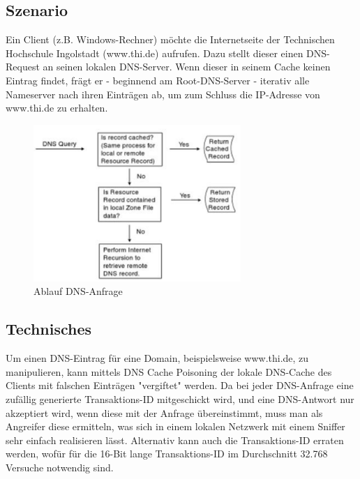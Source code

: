 \subsection*{Szenario}
Ein Client (z.B. Windows-Rechner) möchte die Internetseite der Technischen Hochschule Ingolstadt (www.thi.de) aufrufen. Dazu stellt dieser einen DNS-Request an seinen lokalen DNS-Server.
Wenn dieser in seinem Cache keinen Eintrag findet, frägt er - beginnend am Root-DNS-Server - iterativ alle Nameserver nach ihren Einträgen ab, um zum Schluss die IP-Adresse von www.thi.de
zu erhalten.\\
\begin{figure}[h!]
	\centering
	\includegraphics[width=0.7\textwidth]{bilder/DNS-Request.pdf}
	\caption{Ablauf DNS-Anfrage \cite{young2003hacker}}
	\label{fig:dnsrequest}
\end{figure}

\subsection*{Technisches}
Um einen DNS-Eintrag für eine Domain, beispielsweise www.thi.de, zu manipulieren, kann mittels DNS Cache Poisoning der lokale DNS-Cache des Clients mit falschen Einträgen "vergiftet" werden.
Da bei jeder DNS-Anfrage eine zufällig generierte Transaktions-ID mitgeschickt wird, und eine DNS-Antwort nur akzeptiert wird, wenn diese mit der Anfrage übereinstimmt, muss man als Angreifer diese ermitteln, was sich in einem lokalen Netzwerk mit einem Sniffer sehr einfach realisieren lässt. Alternativ kann auch die Transaktions-ID erraten werden, wofür für die 16-Bit lange Transaktions-ID im Durchschnitt 32.768 Versuche notwendig sind.

